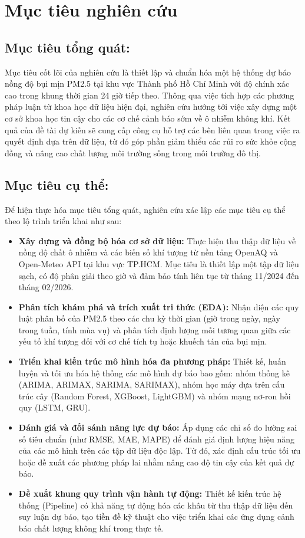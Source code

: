 \section{Mục tiêu nghiên cứu}
    \subsection{Mục tiêu tổng quát:} Mục tiêu cốt lõi của nghiên cứu là thiết lập và chuẩn hóa một hệ thống dự báo nồng độ bụi mịn PM2.5 tại khu vực Thành phố Hồ Chí Minh với độ chính xác cao trong khung thời gian 24 giờ tiếp theo. Thông qua việc tích hợp các phương pháp luận từ khoa học dữ liệu hiện đại, nghiên cứu hướng tới việc xây dựng một cơ sở khoa học tin cậy cho các cơ chế cảnh báo sớm về ô nhiễm không khí. Kết quả của đề tài dự kiến sẽ cung cấp công cụ hỗ trợ các bên liên quan trong việc ra quyết định dựa trên dữ liệu, từ đó góp phần giảm thiểu các rủi ro sức khỏe cộng đồng và nâng cao chất lượng môi trường sống trong môi trường đô thị.
    
    \subsection{Mục tiêu cụ thể:}
    Để hiện thực hóa mục tiêu tổng quát, nghiên cứu xác lập các mục tiêu cụ thể theo lộ trình triển khai như sau:
    \begin{itemize}
        \item \textbf{Xây dựng và đồng bộ hóa cơ sở dữ liệu:} Thực hiện thu thập dữ liệu về nồng độ chất ô nhiễm và các biến số khí tượng từ nền tảng OpenAQ và Open-Meteo API tại khu vực TP.HCM. Mục tiêu là thiết lập một tập dữ liệu sạch, có độ phân giải theo giờ và đảm bảo tính liên tục từ tháng 11/2024 đến tháng 02/2026.
        \item \textbf{Phân tích khám phá và trích xuất tri thức (EDA):} Nhận diện các quy luật phân bố của PM2.5 theo các chu kỳ thời gian (giờ trong ngày, ngày trong tuần, tính mùa vụ) và phân tích định lượng mối tương quan giữa các yếu tố khí tượng đối với cơ chế tích tụ hoặc khuếch tán của bụi mịn.
        \item \textbf{Triển khai kiến trúc mô hình hóa đa phương pháp:} Thiết kế, huấn luyện và tối ưu hóa hệ thống các mô hình dự báo bao gồm: nhóm thống kê (ARIMA, ARIMAX, SARIMA, SARIMAX), nhóm học máy dựa trên cấu trúc cây (Random Forest, XGBoost, LightGBM) và nhóm mạng nơ-ron hồi quy (LSTM, GRU).
        \item \textbf{Đánh giá và đối sánh năng lực dự báo:} Áp dụng các chỉ số đo lường sai số tiêu chuẩn (như RMSE, MAE, MAPE) để đánh giá định lượng hiệu năng của các mô hình trên các tập dữ liệu độc lập. Từ đó, xác định cấu trúc tối ưu hoặc đề xuất các phương pháp lai nhằm nâng cao độ tin cậy của kết quả dự báo.
        \item \textbf{Đề xuất khung quy trình vận hành tự động:} Thiết kế kiến trúc hệ thống (Pipeline) có khả năng tự động hóa các khâu từ thu thập dữ liệu đến suy luận dự báo, tạo tiền đề kỹ thuật cho việc triển khai các ứng dụng cảnh báo chất lượng không khí trong thực tế.
    \end{itemize}
